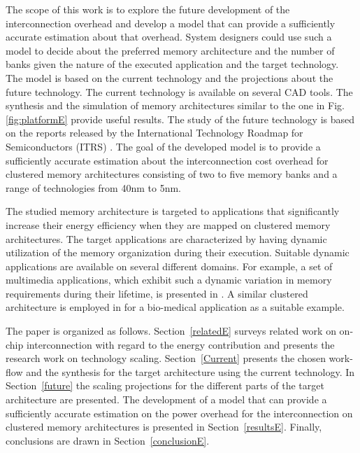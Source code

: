   The scope of this work is to explore the future development of the interconnection overhead and develop a model that can provide a sufficiently accurate estimation about that overhead.
  System designers could use such a model to decide about the preferred memory architecture and the number of banks given the nature of the executed application and the target technology.
  The model is based on the current technology and the projections about the future technology.
  The current technology is available on several CAD tools.
  The synthesis and the simulation of memory architectures similar to the one in Fig.\ref{fig:platformE} provide useful results.
  The study of the future technology is based on the reports released by the International Technology Roadmap for Semiconductors (ITRS) \cite{itrs} .
 The goal of the developed model is to provide a sufficiently accurate estimation about the interconnection cost overhead for clustered memory architectures consisting of two to five memory banks and a range of technologies from 40nm to 5nm.  

   The studied memory architecture is targeted to applications that significantly increase their energy efficiency when they are mapped on clustered memory architectures.
  The target applications are characterized by having dynamic utilization of the memory organization during their execution. 
 Suitable dynamic applications are available on several different domains.
 For example, a set of multimedia applications, which exhibit such a dynamic variation in memory requirements during their lifetime, is presented in \cite{filippopoulos2013exploration}.
 A similar clustered architecture is employed in \cite{Fil12} for a bio-medical application as a suitable example.
 
The paper is organized as follows.
Section~\ref{relatedE} surveys related work on on-chip interconnection with regard to the energy contribution and presents the research work on technology scaling. 
Section~\ref{Current} presents the chosen work-flow and the synthesis for the target architecture using the current technology.
In Section~\ref{future} the scaling projections for the different parts of the target architecture are presented.
The development of a model that can provide a sufficiently accurate estimation on the power overhead for the interconnection on clustered memory architectures is presented in Section~\ref{resultsE}.
Finally, conclusions are drawn in Section~\ref{conclusionE}.


